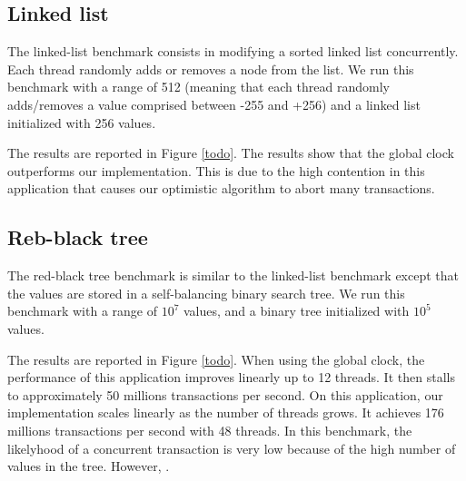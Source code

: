 \subsection{Linked list}

The linked-list benchmark consists in modifying a sorted linked list
concurrently. Each thread randomly adds or removes a node from the
list. We run this benchmark with a range of 512 (meaning that each
thread randomly adds/removes a value comprised between -255 and +256)
and a linked list initialized with 256 values.

The results are reported in Figure \ref{todo}.
%
The results show that the global clock outperforms our
implementation. This is due to the high contention in this application
that causes our optimistic algorithm to abort  many transactions.

\subsection{Reb-black tree}

The red-black tree benchmark is similar to the linked-list benchmark
except that the values are stored in a self-balancing binary search
tree. We run this benchmark with a range of $10^7$ values, and a
binary tree initialized with $10^5$ values.

The results are reported in Figure \ref{todo}.
%
When using the global clock, the performance of this application
improves linearly up to 12 threads. It then stalls to approximately 50
millions transactions per second.
%
On this application, our implementation scales linearly as the number
of threads grows. It achieves 176 millions transactions per second
with 48 threads.
%
In this benchmark, the likelyhood of a concurrent transaction is very
low because of the high number of values in the tree. However,
.
%
